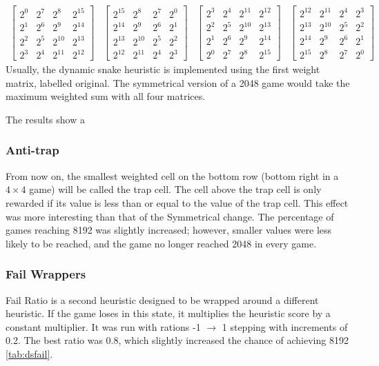 \documentclass{article}
\begin{document}
\[\begin{matrix}
\\
\begin{bmatrix}
    2^{0} & 2^{7} & 2^{8} & 2^{15} \\
    2^{1} & 2^{6} & 2^{9} & 2^{14} \\
    2^{2} & 2^{5} & 2^{10} & 2^{13} \\
    2^{3} & 2^{4} & 2^{11} & 2^{12}
\end{bmatrix}
&
\begin{bmatrix}
    2^{15} & 2^{8} & 2^{7} & 2^{0} \\
    2^{14} & 2^{9} & 2^{6} & 2^{1} \\
    2^{13} & 2^{10} & 2^{5} & 2^{2} \\
    2^{12} & 2^{11} & 2^{4} & 2^{3}
\end{bmatrix}
&
\begin{bmatrix}
    2^{3} & 2^{4} & 2^{11} & 2^{12} \\
    2^{2} & 2^{5} & 2^{10} & 2^{13} \\
    2^{1} & 2^{6} & 2^{9} & 2^{14} \\
    2^{0} & 2^{7} & 2^{8} & 2^{15}
\end{bmatrix}
&
\begin{bmatrix}
    2^{12} & 2^{11} & 2^{4} & 2^{3} \\
    2^{13} & 2^{10} & 2^{5} & 2^{2} \\
    2^{14} & 2^{9} & 2^{6} & 2^{1} \\
    2^{15} & 2^{8} & 2^{7} & 2^{0}
\end{bmatrix}
\end{matrix}
\]
Usually, the dynamic snake heuristic is implemented using the first weight matrix, labelled original. The symmetrical version of a 2048 game would take the maximum weighted sum with all four matrices.

The results show a 
\subsubsection{Anti-trap}
From now on, the smallest weighted cell on the bottom row (bottom right in a $4 \times 4$ game) will be called the trap cell. The cell above the trap cell is only rewarded if its value is less than or equal to the value of the trap cell. This effect was more interesting than that of the Symmetrical change. The percentage of games reaching 8192 was slightly increased; however, smaller values were less likely to be reached, and the game no longer reached 2048 in every game.
\subsubsection{Fail Wrappers}
Fail Ratio is a second heuristic designed to be wrapped around a different heuristic. If the game loses in this state, it multiplies the heuristic score by a constant multiplier. It was run with rations -1 $\rightarrow$ 1 stepping with increments of 0.2. The best ratio was 0.8, which slightly increased the chance of achieving 8192 \ref{tab:dsfail}.
\end{document}
